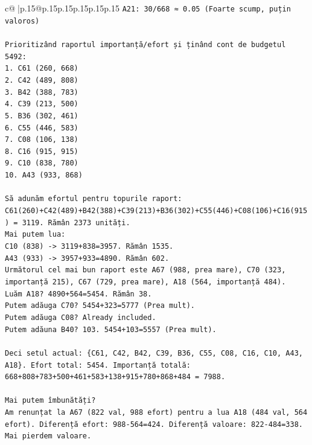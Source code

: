\documentclass{article}
\begin{document}
{\begin{supertabular}{c@{$\;$}|p{.15\linewidth}@{}p{.15\linewidth}p{.15\linewidth}p{.15\linewidth}p{.15\linewidth}p{.15\linewidth}}
{{{\texttt{A21: 30/668 ≈ 0.05 (Foarte scump, puțin valoros)} \\
\\ 
\texttt{Prioritizând raportul importanță/efort și ținând cont de budgetul 5492:} \\
\texttt{1. C61 (260, 668)} \\
\texttt{2. C42 (489, 808)} \\
\texttt{3. B42 (388, 783)} \\
\texttt{4. C39 (213, 500)} \\
\texttt{5. B36 (302, 461)} \\
\texttt{6. C55 (446, 583)} \\
\texttt{7. C08 (106, 138)} \\
\texttt{8. C16 (915, 915)} \\
\texttt{9. C10 (838, 780)} \\
\texttt{10. A43 (933, 868)} \\
\\ 
\texttt{Să adunăm efortul pentru topurile raport:} \\
\texttt{C61(260)+C42(489)+B42(388)+C39(213)+B36(302)+C55(446)+C08(106)+C16(915) = 3119. Rămân 2373 unități.} \\
\texttt{Mai putem lua:} \\
\texttt{C10 (838) {-}> 3119+838=3957. Rămân 1535.} \\
\texttt{A43 (933) {-}> 3957+933=4890. Rămân 602.} \\
\texttt{Următorul cel mai bun raport este A67 (988, prea mare), C70 (323, importanță 215), C67 (729, prea mare), A18 (564, importanță 484).} \\
\texttt{Luăm A18? 4890+564=5454. Rămân 38.} \\
\texttt{Putem adăuga C70? 5454+323=5777 (Prea mult).} \\
\texttt{Putem adăuga C08? Already included.} \\
\texttt{Putem adăuna B40? 103. 5454+103=5557 (Prea mult).} \\
\\ 
\texttt{Deci setul actual: \{C61, C42, B42, C39, B36, C55, C08, C16, C10, A43, A18\}. Efort total: 5454. Importanță totală: 668+808+783+500+461+583+138+915+780+868+484 = 7988.} \\
\\ 
\texttt{Mai putem îmbunătăți?} \\
\texttt{Am renunțat la A67 (822 val, 988 efort) pentru a lua A18 (484 val, 564 efort). Diferență efort: 988{-}564=424. Diferență valoare: 822{-}484=338. Mai pierdem valoare.} \\
}}}
\end{supertabular}}
\end{document}
